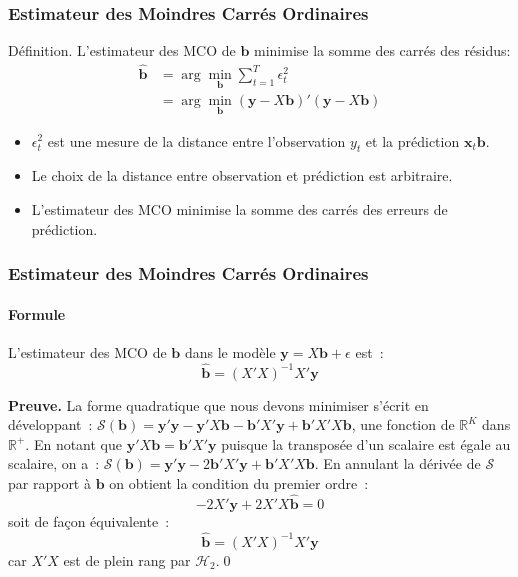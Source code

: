 \documentclass[10pt]{beamer}
\theoremstyle{plain}
\newenvironment{defn}[1]
{\bgroup \small\begin{block}{Définition. #1}}
  {\end{block}\egroup}
\begin{document}
\begin{frame}
  \frametitle{Estimateur des Moindres Carrés Ordinaires}

\begin{defn}{}
  L'estimateur des MCO de $\mathbf b$ minimise la somme des carrés des résidus:
  \[
    \begin{split}
      \hat{\mathbf b} &= \arg\min_{\mathbf b} \sum_{t=1}^T \epsilon_t^2\\
      &= \arg\min_{\mathbf b} (\mathbf y-X \mathbf b)'(\mathbf y-X\mathbf b)
    \end{split}
  \]
\end{defn}

\bigskip

\begin{itemize}

\item $\epsilon_t^2$ est une mesure de la distance entre l'observation $y_t$ et la prédiction $\mathbf x_t\mathbf b$.\newline

\item Le choix de la distance entre observation et prédiction est
  arbitraire.\newline

\item L'estimateur des MCO minimise la somme des carrés des erreurs de prédiction.\newline

\end{itemize}

\end{frame}


\begin{frame}
  \frametitle{Estimateur des Moindres Carrés Ordinaires}
  \framesubtitle{Formule}

\begin{theorem}\label{thm:ols}
  L'estimateur des MCO de $\mathbf b$ dans le modèle $\mathbf y=X\mathbf b + \epsilon$ est~:
  \[
    \hat{\mathbf{b}} = \left( X'X \right)^{-1}X'\mathbf y
  \]
\end{theorem}


\bigskip

\textbf{Preuve.} \small{La forme quadratique que nous devons minimiser s'écrit en développant~: $\mathcal S(\mathbf b) = \mathbf y'\mathbf y-\mathbf y'X\mathbf b-\mathbf b'X'\mathbf y+\mathbf b'X'X\mathbf b$, une fonction de $\mathbb R^K$ dans $\mathbb R^+$. En notant que $\mathbf y'X\mathbf b = \mathbf b'X'\mathbf y$ puisque la transposée d'un scalaire est égale au scalaire, on a~: $\mathcal S(\mathbf b) = \mathbf y'\mathbf y-2\mathbf b'X'\mathbf y+\mathbf b'X'X\mathbf b$. En annulant la dérivée de $\mathcal S$ par rapport à $\mathbf b$ on obtient la condition du premier ordre~:
\[
-2X'\mathbf y + 2 X'X \hat{\mathbf b} = 0
\]
soit de façon équivalente~:
\[
\hat{\mathbf{b}} = \left( X'X \right)^{-1}X'\mathbf y
\]
car $X'X$ est de plein rang par $\mathcal H_2$.}\qed
\end{frame}
\end{document}
